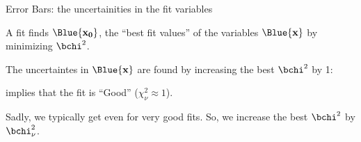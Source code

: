 \begin{slide}{Error Bars: the uncertainities in the fit variables}
\small
\hspace{-.1mm}
\begin{center}
  \begin{minipage}{95mm}\setlength{\baselineskip}{10pt}
    
    A fit finds $\Blue{\mathbf{x_0}}$, the ``best fit values'' of the variables
    $\Blue{\mathbf{x}}$ by minimizing $\bchi^2$.

    
    \vmm \vmm The uncertaintes in $\Blue{\mathbf{x}}$ are found by increasing
    the best $\bchi^2$ by 1:

    \vmm
    \begin{center}  
    \end{center}
      
    \vmm

    {} implies that the fit is ``Good'' ($\chi^2_\nu
    \approx 1$).
    
    \vmm Sadly, we typically get {}
    even for very good fits.
    So, we increase the best $\bchi^2$ by $\bchi^2_\nu$.
    
    \vmm 
    \begin{center}{}
    \end{center}
    
  \end{minipage}
\end{center}
\vspace{1mm} \vfill
\end{slide} 

